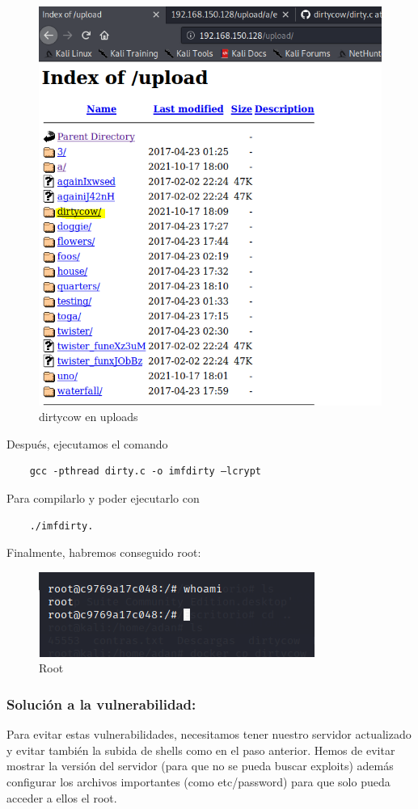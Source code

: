 \documentclass[12pt,twoside]{article}
\begin{document}
\begin{figure}[H]
    \centering
    \includegraphics[scale=0.5]{./imagenes/dirtycow_2}
    \caption{dirtycow en uploads}
\end{figure}
Después, ejecutamos el comando
\begin{verbatim}
    gcc -pthread dirty.c -o imfdirty –lcrypt
\end{verbatim}
Para compilarlo y poder ejecutarlo con \begin{verbatim}
    ./imfdirty.
\end{verbatim}
Finalmente, habremos conseguido root:
\begin{figure}[H]
    \centering
    \includegraphics[scale=0.7]{./imagenes/dirtycow_3}
    \caption{Root}
\end{figure}
\subsubsection*{Solución a  la vulnerabilidad:}
Para evitar estas vulnerabilidades, necesitamos tener nuestro servidor actualizado y evitar también la subida de shells como en el paso anterior. 
Hemos de evitar mostrar la versión del servidor (para que no se pueda buscar exploits) además configurar los archivos importantes (como etc/password) para que solo pueda acceder a ellos el root.
\end{document}
